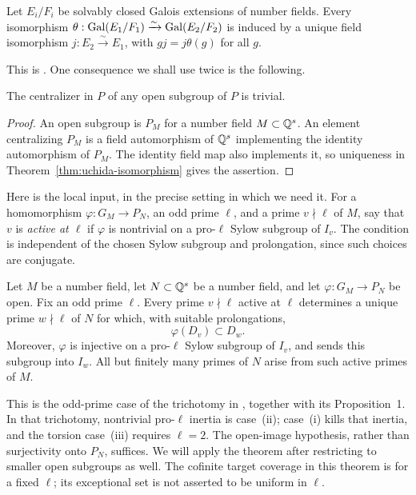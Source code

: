 \begin{theorem}[Uchida]\label{thm:uchida-isomorphism}
Let $E_i/F_i$ be solvably closed Galois extensions of number fields. Every isomorphism
$\theta:\operatorname{Gal}(E_1/F_1)\xrightarrow{\sim}\operatorname{Gal}(E_2/F_2)$
is induced by a unique field isomorphism $j:E_2\xrightarrow{\sim}E_1$, with
$g j=j\theta(g)$ for all $g$.
\end{theorem}
This is \cite[Theorem]{uchida1979}. One consequence we shall use twice is the following.
\begin{lemma}\label{lem:centralizer}
The centralizer in $P$ of any open subgroup of $P$ is trivial.
\end{lemma}
\begin{proof}
An open subgroup is $P_M$ for a number field $M\subset\mathbb Q^s$. An element centralizing $P_M$ is a field automorphism of $\mathbb Q^s$ implementing the identity automorphism of $P_M$. The identity field map also implements it, so uniqueness in Theorem~\ref{thm:uchida-isomorphism} gives the assertion.
\end{proof}

Here is the local input, in the precise setting in which we need it. For a homomorphism $\varphi:G_M\to P_N$, an odd prime $\ell$, and a prime $v\nmid\ell$ of $M$, say that $v$ is \emph{active at $\ell$} if $\varphi$ is nontrivial on a pro-$\ell$ Sylow subgroup of $I_v$. The condition is independent of the chosen Sylow subgroup and prolongation, since such choices are conjugate.

\begin{theorem}\label{thm:local-correspondence}
Let $M$ be a number field, let $N\subset\mathbb Q^s$ be a number field, and let $\varphi:G_M\to P_N$ be open. Fix an odd prime $\ell$. Every prime $v\nmid\ell$ active at $\ell$ determines a unique prime $w\nmid\ell$ of $N$ for which, with suitable prolongations,
\[
 \varphi(D_v)\subset D_w.
\]
Moreover, $\varphi$ is injective on a pro-$\ell$ Sylow subgroup of $I_v$, and sends this subgroup into $I_w$. All but finitely many primes of $N$ arise from such active primes of $M$.
\end{theorem}
This is the odd-prime case of the trichotomy in \cite[\S1, pp.~595--596]{uchida1981}, together with its Proposition~1. In that trichotomy, nontrivial pro-$\ell$ inertia is case~(ii); case~(i) kills that inertia, and the torsion case~(iii) requires $\ell=2$. The open-image hypothesis, rather than surjectivity onto $P_N$, suffices. We will apply the theorem after restricting to smaller open subgroups as well. The cofinite target coverage in this theorem is for a fixed $\ell$; its exceptional set is not asserted to be uniform in $\ell$.

